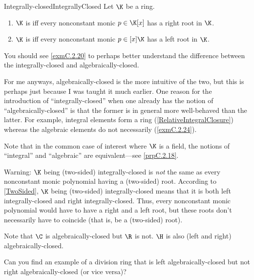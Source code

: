 \begin{dfn}{Integrally-closed}{IntegrallyClosed}
	Let $\K$ be a ring.
	\begin{enumerate}
		\item $\K$ is  iff every nonconstant monic $p\in \K [x]$ has a right root in $\K$.
		\item $\K$ is  iff every nonconstant monic $p\in [x]\K$ has a left root in $\K$.
	\end{enumerate}
	\begin{rmk}
		You should see \cref{exmC.2.20} to perhaps better understand the difference between the integrally-closed and algebraically-closed.
		
		For me anyways, algebraically-closed is the more intuitive of the two, but this is perhaps just because I was taught it much earlier.  One reason for the introduction of ``integrally-closed'' when one already has the notion of ``algebraically-closed'' is that the former is in general more well-behaved than the latter.  For example, integral elements form a ring (\cref{RelativeIntegralClosure}) whereas the algebraic elements do not necessarily (\cref{exmC.2.24}).
	\end{rmk}
	\begin{rmk}
		Note that in the common case of interest where $\K$ is a field, the notions of ``integral'' and ``algebraic'' are equivalent---see \cref{prpC.2.18}.
	\end{rmk}
	\begin{rmk}
		Warning:  $\K$ being (two-sided) integrally-closed is \emph{not} the same as every nonconstant monic polynomial having a (two-sided) root.  According to \cref{TwoSided}, $\K$ being (two-sided) integrally-closed means that it is both left integrally-closed and right integrally-closed.  Thus, every nonconstant monic polynomial would have to have a right and a left root, but these roots don't necessarily have to coincide (that is, be a (two-sided) root).
	\end{rmk}
\end{dfn}
\begin{exm}{}{}
	Note that $\C$ is algebraically-closed but $\R$ is not.  $\H$ is also (left and right) algebraically-closed.
\end{exm}
\begin{exr}{}{}
	Can you find an example of a division ring that is left algebraically-closed but not right algebraically-closed (or vice versa)?
\end{exr}
